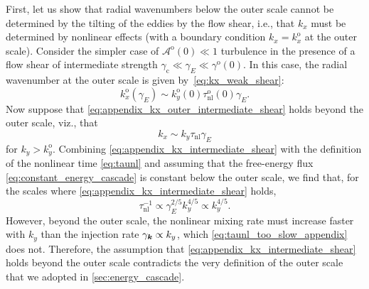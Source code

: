 \documentclass{jpp}
\newcommand{\taunl}{\tau_\text{nl}}
\newcommand{\kxo}{k_x^\text{o}}
\newcommand{\kyo}{k_y^\text{o}}
\newcommand{\taunloO}{\tau_{\text{nl}}^\text{o}(0)}
\newcommand{\kyoO}{k_{y}^\text{o}(0)}
\newcommand{\gammaoO}{\gamma^\text{o}(0)}
\newcommand{\gammaani}{\gamma_{\text{c}}}
\newcommand{\gammaE}{\gamma_{E}}
\newcommand{\A}{\mathcal{A}}
\newcommand{\AoO}{\A^\text{o}(0)}
\begin{document}
First, let us show that radial wavenumbers below the outer scale cannot be determined by the tilting of the eddies by the flow shear, i.e., that \(k_x\) must be determined by nonlinear effects (with a boundary condition \(k_x = \kxo\) at the outer scale). Consider the simpler case of \(\AoO \ll 1\) turbulence in the presence of a flow shear of intermediate strength \(\gammaani \ll \gammaE \ll \gammaoO\). In this case, the radial wavenumber at the outer scale is given by~\cref{eq:kx_weak_shear}:
\begin{equation}
	\kxo(\gammaE) \sim \kyoO \taunloO \gammaE.
	\label{eq:appendix_kx_outer_intermediate_shear}
\end{equation}
Now suppose that \cref{eq:appendix_kx_outer_intermediate_shear} holds beyond the outer scale, viz., that
\begin{equation}
	k_x \sim k_y \taunl \gammaE
	\label{eq:appendix_kx_intermediate_shear}
\end{equation}
for \(k_y > \kyo\). Combining \cref{eq:appendix_kx_intermediate_shear} with the definition of the nonlinear time \cref{eq:taunl} and assuming that the free-energy flux \cref{eq:constant_energy_cascade} is constant below the outer scale, we find that, for the scales where \cref{eq:appendix_kx_intermediate_shear} holds,
\begin{equation}
	\taunl^{-1} \propto \gammaE^{2/5} k_y^{4/5} \propto k_y^{4/5}.
	\label{eq:taunl_too_slow_appendix}
\end{equation}
However, beyond the outer scale, the nonlinear mixing rate must increase faster with \(k_y\) than the injection rate \(\gamma_{\boldsymbol{k}} \propto k_y\), which \cref{eq:taunl_too_slow_appendix} does not. Therefore, the assumption that \cref{eq:appendix_kx_intermediate_shear} holds beyond the outer scale contradicts the very definition of the outer scale that we adopted in \cref{sec:energy_cascade}.
\end{document}
